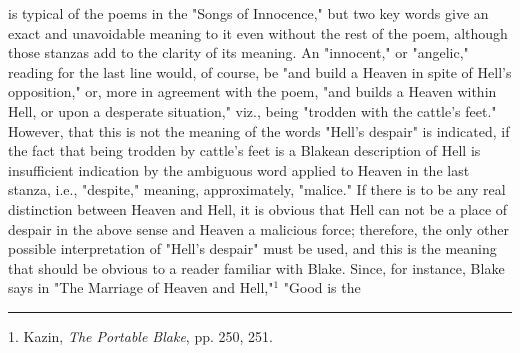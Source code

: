 is typical of the poems in the "Songs of Innocence," but two key words give an exact
and unavoidable meaning to it even without the rest of the poem, although those stanzas add to the clarity
of its meaning. An "innocent," or "angelic," reading for the last line would, of course, be "and build a Heaven in spite
of Hell's opposition," or, more in agreement with the poem, "and builds a Heaven within Hell, or upon a desperate situation,"
viz., being "trodden with the cattle's feet." However, that this is not the meaning of the words "Hell's despair" is
indicated, if the fact that being trodden by cattle's feet is a Blakean description of Hell is insufficient
indication by the ambiguous word applied to Heaven in the last stanza, i.e., "despite," meaning, approximately,
"malice." If there is to be any real distinction between Heaven and Hell, it is obvious that Hell can not be 
a place of despair in the above sense and Heaven a malicious force; therefore, the only other possible interpretation
of "Hell's despair" must be used, and this is the meaning that should be obvious to a reader familiar with Blake. Since,
for instance, Blake says in "The Marriage of Heaven and Hell,"$^{1}$ "Good is the\linebreak
\null\par
\vspace*{-\baselineskip}
\vspace*{\fill}
\noindent\rule{0.25\textwidth}{0.4pt}\par
1. Kazin, \textit{The Portable Blake}, pp. 250, 251.\par

\newpage

